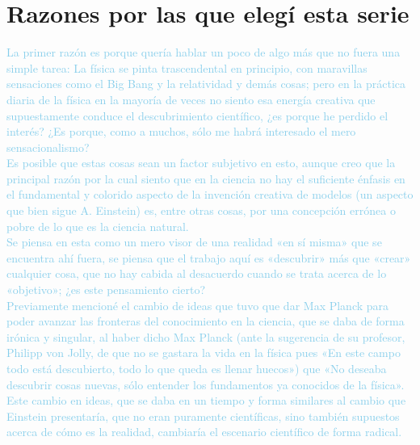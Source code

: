 \documentclass{article}
\begin{document}
\section*{Razones por las que elegí esta serie}

\textcolor{SkyBlue}{La primer razón es porque quería hablar un poco de algo más que no fuera una simple tarea: La física se pinta trascendental en principio, con maravillas sensaciones como el Big Bang y la relatividad y demás cosas; pero en la práctica diaria de la física en la mayoría de veces no siento esa energía creativa que supuestamente conduce el descubrimiento científico, ¿es porque he perdido el interés? ¿Es porque, como a muchos, sólo me habrá interesado el mero sensacionalismo? \\
Es posible que estas cosas sean un factor subjetivo en esto, aunque creo que la principal razón por la cual siento que en la ciencia no hay el suficiente énfasis en el fundamental y colorido aspecto de la invención creativa de modelos (un aspecto que bien sigue A. Einstein) es, entre otras cosas, por una concepción errónea o pobre de lo que es la ciencia natural. \\
Se piensa en esta como un mero visor de una realidad «en sí misma» que se encuentra ahí fuera, se piensa que el trabajo aquí es «descubrir» más que «crear» cualquier cosa, que no hay cabida al desacuerdo cuando se trata acerca de lo «objetivo»; ¿es este pensamiento cierto? \\
Previamente mencioné el cambio de ideas que tuvo que dar Max Planck para poder avanzar las fronteras del conocimiento en la ciencia, que se daba de forma irónica y singular, al haber dicho Max Planck (ante la sugerencia de su profesor, Philipp von Jolly, de que no se gastara la vida en la física pues «En este campo todo está descubierto, todo lo que queda es llenar huecos») que «No deseaba descubrir cosas nuevas, sólo entender los fundamentos ya conocidos de la física». \\
Este cambio en ideas, que se daba en un tiempo y forma similares al cambio que Einstein presentaría, que no eran puramente científicas, sino también supuestos acerca de cómo es la realidad, cambiaría el escenario científico de forma radical.} \\
\end{document}
